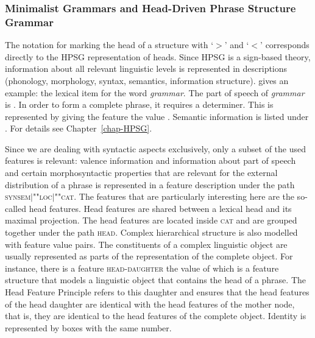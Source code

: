 \subsubsection{Minimalist Grammars and Head-Driven Phrase Structure Grammar}
\label{sec-minimalism-atb-extraction}\label{sec-mg-hpsg}

The notation for marking the head of a structure with `$>$' and `$<$' corresponds directly to the
HPSG representation of heads. Since HPSG is a sign-based theory, information about all relevant
linguistic levels is represented in descriptions (phonology, morphology, syntax, semantics,
information structure).  gives an example: the lexical item for the word \emph{grammar}.
\ea 
{}
\z
The part of speech of \emph{grammar} is . In order to form a complete phrase, it requires
a determiner. This is represented by giving the \spr feature the value . Semantic
information is listed under \cont. For details see Chapter~\ref{chap-HPSG}.

Since we are dealing with syntactic aspects exclusively, only a subset of the used features is
relevant: valence information and information about part of speech and certain
morphosyntactic properties that are relevant for the external distribution of a phrase is
represented in a feature description under the path \textsc{synsem$|$""loc$|$""cat}. The features that
are particularly interesting here are the so-called head features. Head features are shared between
a lexical head and its maximal projection. The head features are located inside \textsc{cat} and are
grouped together under the path \textsc{head}. Complex hierarchical structure is also modelled with
feature value pairs. The constituents of a complex linguistic object are usually represented as
parts of the representation of the complete object. For instance, there is a feature \textsc{head-daughter} the value of which is a feature structure that models a linguistic object that
contains the head of a phrase. The Head Feature Principle  refers to this daughter and ensures that the head
features of the head daughter are identical with the head features of the mother node, that is, they
are identical to the head features of the complete object.
\ea
{} \impl
{} 
\z
Identity is represented by boxes with the same number. 

